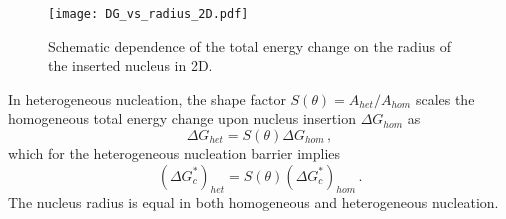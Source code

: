 \begin{figure}
	\centering
%			
%			
%			
	\texttt{[image: DG\_vs\_radius\_2D.pdf]}
	\caption{Schematic dependence of the total energy change on the radius of the inserted nucleus in 2D.}
	\label{fig_DG_2D_sketch}
\end{figure}

In heterogeneous nucleation, the shape factor $S(\theta)=A_{het}/A_{hom}$ scales the homogeneous total energy change upon nucleus insertion $\Delta G_{hom}$ as
\begin{equation}\label{eq_DG_het_2D}
	\Delta G_{het} = S(\theta)\Delta G_{hom} \,,
\end{equation}
which for the heterogeneous nucleation barrier implies
\begin{equation}\label{eq_nucl_barr_het_2D}
	(\Delta G_c^*)_{het} = S(\theta)(\Delta G_c^*)_{hom}\,.
\end{equation}
The nucleus radius is equal in both homogeneous and heterogeneous nucleation.

